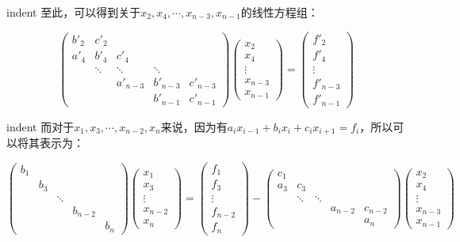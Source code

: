 \documentclass[UTF8,nofonts]{ctexart}
\begin{document}
indent 至此，可以得到关于$x_2,x_4,\cdots,x_{n-3},x_{n-1}$的线性方程组：

\begin{equation}
\label{eq:even}
\begin{pmatrix}
b'_2 & c'_2 & & & \\
a'_4 & b'_4 & c'_4 & & \\
& \ddots & \ddots & \ddots & \\
& & a'_{n-3} & b'_{n-3} & c'_{n-3} \\
& & & b'_{n-1} & c'_{n-1}
\end{pmatrix}
\begin{pmatrix}
x_2 \\ x_4 \\ \vdots \\ x_{n-3} \\ x_{n-1}
\end{pmatrix}=
\begin{pmatrix}
f'_2 \\ f'_4 \\ \vdots \\ f'_{n-3} \\ f'_{n-1}
\end{pmatrix}
\end{equation}

indent 而对于$x_1,x_3,\cdots,x_{n-2},x_n$来说，因为有$a_ix_{i-1}+b_ix_i+c_ix_{i+1}= f_i$，所以可以将其表示为：

\begin{equation}
\label{eq:odd}
\begin{pmatrix}
b_1 & & & & \\
& b_3 & & & \\
& & \ddots & & \\
& & & b_{n-2} & \\
& & & & b_n
\end{pmatrix}
\begin{pmatrix}
x_1 \\ x_3 \\ \vdots \\ x_{n-2} \\ x_{n}
\end{pmatrix}=
\begin{pmatrix}
f_1 \\ f_3 \\ \vdots \\ f_{n-2} \\ f_n
\end{pmatrix}-
\begin{pmatrix}
c_1 & & & & \\
a_3 & c_3 & & & \\
& \ddots & \ddots & & \\
& & & a_{n-2} & c_{n-2} \\
& & & & a_n
\end{pmatrix}
\begin{pmatrix}
x_2 \\ x_4 \\ \vdots \\ x_{n-3} \\ x_{n-1}
\end{pmatrix}
\end{equation}
\end{document}
